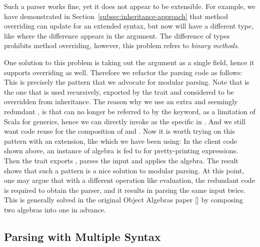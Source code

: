 Such a parser works fine, yet it does not appear to be extensible. For example, we have demonstrated in Section~\ref{subsec:inheritance-approach} that method overriding can update  for an extended syntax, but now  will have a different type, like   where the difference appears in the argument. The difference of types prohibits method overriding, however, this problem refers to \textit{binary methods}. 

One solution to this problem is taking out the argument as a single field, hence it supports overriding as well. Therefore we refactor the parsing code as follows:
This is precisely the pattern that we advocate for modular parsing. Note that  is the one that is used recursively, exported by the trait and considered to be overridden from inheritance. The reason why we use an extra and seemingly redundant , is that  can no longer be referred to by the  keyword, as a limitation of Scala for generics, hence we can directly invoke  as the specific  in . And we still want code reuse for the composition of  and . Now it is worth trying on this pattern with an extension, like  which we have been using:
In the client code shown above, an instance of algebra is fed to  for pretty-printing expressions. Then the trait exports , parses the input and applies the algebra. The result shows that such a pattern is a nice solution to modular parsing. At this point, one may argue that with a different operation like evaluation, the redundant code is required to obtain the parser, and it results in parsing the same input twice. This is generally solved in the original Object Algebras paper [] by composing two algebras into one in advance.

\subsection{Parsing with Multiple Syntax}\label{subsec:differentsyntax}

